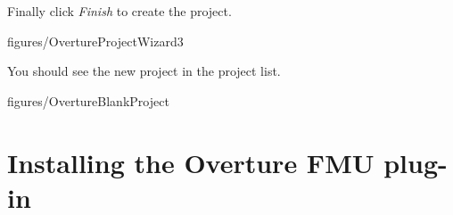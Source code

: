 \documentclass[11pt,a4paper]{../tutorial}
\begin{document}
\begin{instructions}
\item Finally click \emph{Finish} to create the project.

    \begin{annotation}[width=0.6\linewidth]{figures/OvertureProjectWizard3}
    \end{annotation}

    You should see the new project in the project list.

    \begin{annotation}[width=\linewidth,trim=0 400 0 0,clip]{figures/OvertureBlankProject}
    \end{annotation}

\end{instructions}

\newpage

\section{Installing the Overture FMU plug-in}
\end{document}
